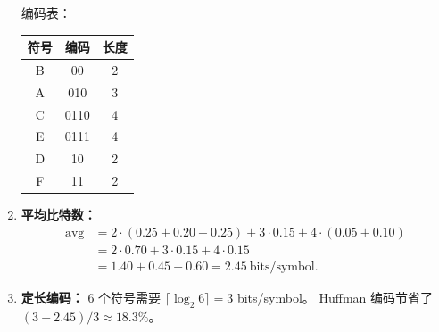 \documentclass[11pt,a4paper,fontset=mac]{ctexart}
\begin{document}
\begin{enumerate}[label=(\alph*)]
  编码表：
  \begin{center}
  \begin{tabular}{c|c|c}
  \toprule
  符号 & 编码 & 长度 \\
  \midrule
  B & 00   & 2 \\
  A & 010  & 3 \\
  C & 0110 & 4 \\
  E & 0111 & 4 \\
  D & 10   & 2 \\
  F & 11   & 2 \\
  \bottomrule
  \end{tabular}
  \end{center}

  \item \textbf{平均比特数：}
  \[
  \begin{aligned}
  \text{avg} &= 2\cdot(0.25+0.20+0.25) + 3\cdot0.15 + 4\cdot(0.05+0.10)\\
            &= 2\cdot0.70 + 3\cdot0.15 + 4\cdot0.15 \\
            &= 1.40 + 0.45 + 0.60 = 2.45\ \text{bits/symbol}.
  \end{aligned}
  \]

  \item \textbf{定长编码：}
  6 个符号需要 $\lceil\log_2 6\rceil = 3$ bits/symbol。
  Huffman 编码节省了 $(3-2.45)/3 \approx 18.3\%$。
\end{enumerate}
\end{document}
